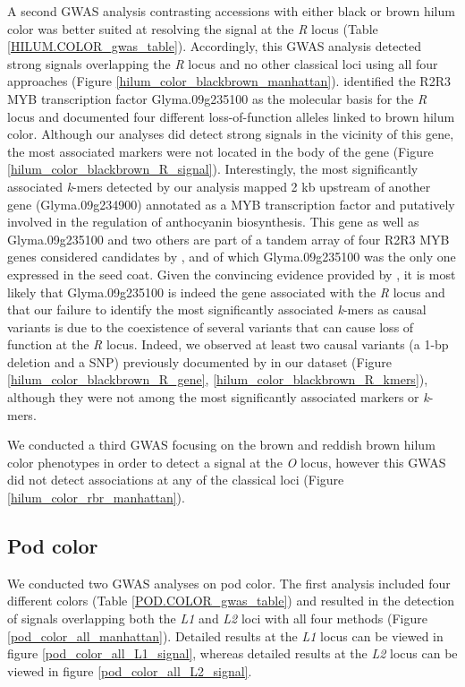 \documentclass[12pt]{article}
\begin{document}
A second GWAS analysis contrasting accessions with either black or brown hilum
color was better suited at resolving the signal at the \emph{R} locus (Table
\ref{HILUM.COLOR_gwas_table}). Accordingly, this GWAS analysis detected strong
signals overlapping the \emph{R} locus and no other classical loci using all
four approaches (Figure \ref{hilum_color_blackbrown_manhattan}).
\cite{gillman2011} identified the R2R3 MYB transcription factor Glyma.09g235100
as the molecular basis for the \emph{R} locus and documented four different
loss-of-function alleles linked to brown hilum color. Although our analyses did
detect strong signals in the vicinity of this gene, the most associated markers
were not located in the body of the gene (Figure
\ref{hilum_color_blackbrown_R_signal}). Interestingly, the most significantly
associated \emph{k}-mers detected by our analysis mapped 2 kb upstream of
another gene (Glyma.09g234900) annotated as a MYB transcription factor and
putatively involved in the regulation of anthocyanin biosynthesis. This gene
as well as Glyma.09g235100 and two others are part of a tandem array of four
R2R3 MYB genes considered candidates by \cite{gillman2011}, and of which
Glyma.09g235100 was the only one expressed in the seed coat. Given the
convincing evidence provided by \cite{gillman2011}, it is most likely that
Glyma.09g235100 is indeed the gene associated with the \emph{R} locus and that
our failure to identify the most significantly associated \emph{k}-mers as
causal variants is due to the coexistence of several variants that can cause
loss of function at the \emph{R} locus. Indeed, we observed at least two causal
variants (a 1-bp deletion and a SNP) previously documented by
\cite{gillman2011} in our dataset (Figure \ref{hilum_color_blackbrown_R_gene},
\ref{hilum_color_blackbrown_R_kmers}), although they were not among the most
significantly associated markers or \emph{k}-mers.

We conducted a third GWAS focusing on the brown and reddish brown hilum color
phenotypes in order to detect a signal at the \emph{O} locus, however this GWAS
did not detect associations at any of the classical loci (Figure
\ref{hilum_color_rbr_manhattan}).

\subsection{Pod color}
\label{sv-gwas-pod-color}

We conducted two GWAS analyses on pod color. The first analysis included four
different colors (Table \ref{POD.COLOR_gwas_table}) and resulted in the
detection of signals overlapping both the \emph{L1} and \emph{L2} loci with all
four methods (Figure \ref{pod_color_all_manhattan}). Detailed results at the
\textit{L1} locus can be viewed in figure \ref{pod_color_all_L1_signal},
whereas detailed results at the \textit{L2} locus can be viewed in figure
\ref{pod_color_all_L2_signal}.
\end{document}
